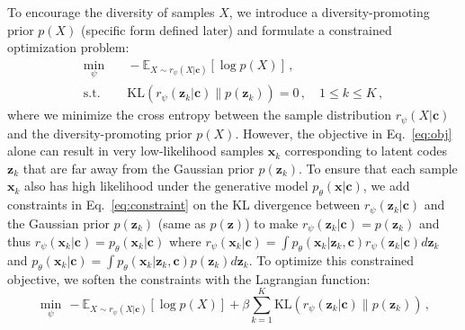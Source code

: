 \documentclass[runningheads]{llncs}
\begin{document}
	
	To encourage the diversity of samples $X$, we introduce a diversity-promoting prior $p(X)$ (specific form defined later) and formulate a constrained optimization problem:
	\vspace{-2mm}
	\begin{align}
	\label{eq:obj}
	\min_\psi & \quad -\mathbb{E}_{X \sim r_\psi(X|\mathbf{c})}[\log p(X)]\,, \\
	\label{eq:constraint}
	\text{s.t.} & \quad \text{KL} (r_\psi(\mathbf{z}_k|\mathbf{c}) \| p(\mathbf{z}_k)) = 0\,, \quad 1 \leq k \leq K\,,
	\end{align}
	where we minimize the cross entropy between the sample distribution $r_\psi(X|\mathbf{c})$ and the diversity-promoting prior $p(X)$.
	However, the objective in Eq.~\eqref{eq:obj} alone can result in very low-likelihood samples $\mathbf{x}_k$ corresponding to latent codes $\mathbf{z}_k$ that are far away from the Gaussian prior $p(\mathbf{z}_k)$.
	To ensure that each sample $\mathbf{x}_k$ also has high likelihood under the generative model $p_\theta(\mathbf{x}|\mathbf{c})$,  we add constraints in Eq.~\eqref{eq:constraint} on the KL divergence between $r_\psi(\mathbf{z}_k|\mathbf{c})$ and the Gaussian prior $p(\mathbf{z}_k)$ (same as $p(\mathbf{z})$) to make $r_\psi(\mathbf{z}_k|\mathbf{c}) = p(\mathbf{z}_k)$ and thus $r_\psi(\mathbf{x}_k|\mathbf{c}) = p_\theta(\mathbf{x}_k|\mathbf{c})$ where $r_\psi(\mathbf{x}_k|\mathbf{c})= \int p_\theta(\mathbf{x}_k|\mathbf{z}_k, \mathbf{c})r_\psi(\mathbf{z}_k|\mathbf{c})d\mathbf{z}_k$ and $ p_\theta(\mathbf{x}_k|\mathbf{c})= \int p_\theta(\mathbf{x}_k|\mathbf{z}_k, \mathbf{c})p(\mathbf{z}_k)d\mathbf{z}_k$. To optimize this constrained objective, we soften the constraints with the Lagrangian function:
	\vspace{-2mm}
	\begin{equation}
	\label{eq:dlow_opt}
	\min_\psi \, -\mathbb{E}_{X \sim r_\psi(X|\mathbf{c})}[\log p(X)] +\beta\sum_{k=1}^K\text{KL} (r_\psi(\mathbf{z}_k|\mathbf{c}) \| p(\mathbf{z}_k))\,,
	\end{equation}
\end{document}
